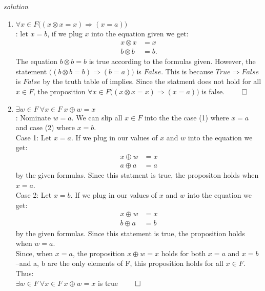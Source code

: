 \documentclass[11pt,twoside]{amsart}
\theoremstyle{definition}
\begin{document}
\emph{solution}
    \begin{enumerate}[label= 2.\arabic*, itemsep=0.4cm]
        \item %
          $\forall x \in F \Big((x\otimes x = x) \Rightarrow (x = a) \Big)$ \\
           : let $x=b$, if we plug $x$ into the equation given we get:
          \begin{align*} 
            x \otimes x &= x \\
            b \otimes b &= b.
          \end{align*}
          The equation $b \otimes b = b$ is true according to the formulas given. However, the statement $\Big((b\otimes b = b) \Rightarrow (b = a) \Big)$ is $False$. This is because $True \Rightarrow False$ is $False$ by the truth table of implies. Since the statment does not hold for all $x \in F$, the proposition $\forall x \in F \Big((x\otimes x = x) \Rightarrow (x = a) \Big)$ is false. $\qed$
\newpage
        \item %
          $\exists w \in F \ \forall x \in F \ x \oplus w = x$ \medskip \\
           : Nominate $w = a$. We can slip all $x \in F$ into the the case (1) where $x=a$ and case (2) where $x=b$.
          \medskip \\
          Case 1: Let $x=a$. If we plug in our values of $x$ and $w$ into the equation we get:
        \begin{align*}
          x \oplus w &= x \\
          a \oplus a &= a
        \end{align*}
          by the given formulas. Since this statment is true, the propositon holds when $x =a$.
     \medskip \\
     Case 2: Let $x=b$. If we plug in our values of $x$ and $w$ into the equation we get:
     \begin{align*}
       x \oplus w &= x \\
       b \oplus a &= b
     \end{align*}
      by the given formulas. Since this statement is true, the proposition holds when $w =a$.
      \medskip \\
      Since, when $x=a$, the proposition $x \oplus w = x$ holds for both $x=a$ and $x=b$--and a, b are the only elements of F, this proposition holds for all $x \in F$. Thus: \\ $\exists w \in F \ \forall x \in F \ x \oplus w = x$ is true $\qed$



\end{enumerate}
\end{document}

